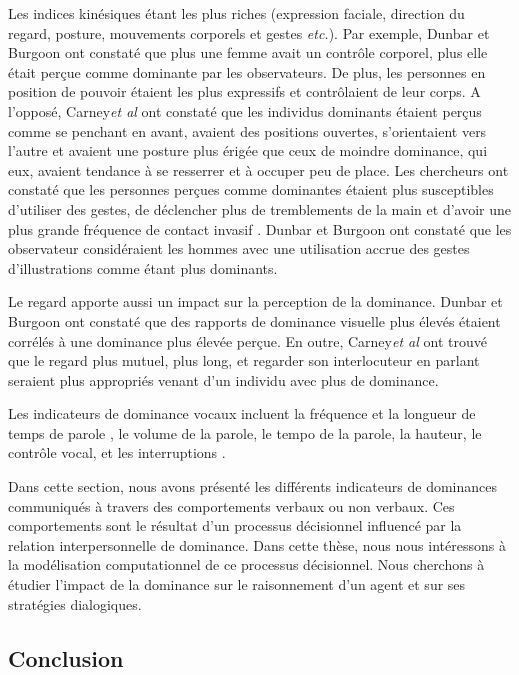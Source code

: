 			 Les indices kinésiques étant les plus riches (expression faciale, direction du regard, posture, mouvements corporels et gestes \emph{etc.}).
			Par exemple, Dunbar et Burgoon \cite{dunbar2005perceptions} ont constaté que plus une femme avait un contrôle corporel, plus elle était perçue comme dominante par les observateurs. De plus, les personnes en position de pouvoir  étaient les plus expressifs et  contrôlaient de leur corps.
			A l'opposé,  Carney\emph{et al}\cite{hall2005nonverbal} ont constaté que les individus dominants étaient perçus comme se penchant en avant, avaient des positions ouvertes, s'orientaient vers l'autre et avaient une posture plus érigée que ceux de moindre dominance, qui eux, avaient tendance à se resserrer et à occuper peu de place. Les chercheurs ont constaté que les personnes perçues comme dominantes étaient plus susceptibles d'utiliser des gestes, de déclencher plus de tremblements de la main et d'avoir une plus grande fréquence de contact invasif \cite{hall2005nonverbal}.
			 Dunbar et Burgoon \cite{dunbar2005perceptions} ont constaté que les observateur considéraient les hommes avec une utilisation accrue des gestes d'illustrations comme étant plus dominants.
			
			Le regard apporte aussi un impact sur la perception de la dominance. Dunbar et Burgoon \cite{dunbar2005perceptions} ont constaté que des rapports de dominance visuelle plus élevés étaient corrélés à une dominance plus élevée perçue. En outre, Carney\emph{et al} \cite{hall2005nonverbal} ont trouvé que le regard plus mutuel, plus long, et regarder son interlocuteur en parlant seraient plus appropriés venant d'un individu avec plus de dominance.
			
			Les indicateurs de dominance vocaux incluent la fréquence et la longueur de temps de parole \cite{mast2002dominance}, le volume de la parole, le tempo de la parole, la hauteur, le contrôle vocal, et les interruptions \cite{dunbar2005perceptions}.
		
		Dans cette section, nous avons présenté les différents indicateurs de dominances communiqués à travers des comportements verbaux ou non verbaux. Ces comportements sont le résultat d'un processus décisionnel influencé par la relation interpersonnelle de dominance. Dans cette thèse, nous nous intéressons à la modélisation computationnel de ce processus décisionnel. Nous cherchons à étudier l'impact de la dominance sur le raisonnement d'un agent et sur ses stratégies dialogiques. 
		
		\subsection{Conclusion}
			
